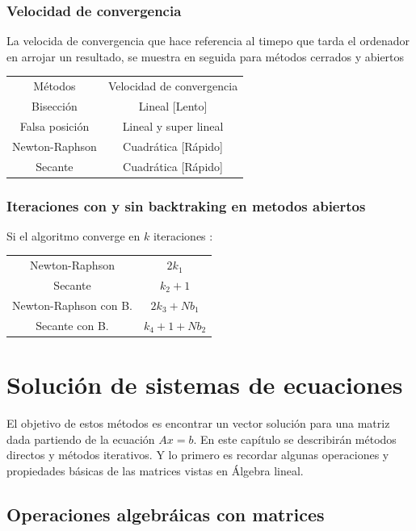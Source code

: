 \subsection*{Velocidad de convergencia}
La velocida de convergencia que hace referencia al timepo que tarda el ordenador en arrojar un resultado, se muestra en seguida para m\'etodos cerrados y abiertos 
\\
\begin{center}
\begin{tabular}{	c		c	}
M\'etodos & Velocidad de convergencia \\
Bisecci\'on & Lineal [Lento] \\
Falsa posici\'on & Lineal y super lineal \\
Newton-Raphson & Cuadr\'atica [R\'apido] \\
Secante & Cuadr\'atica [R\'apido] \\
\end{tabular}
\end{center}

\subsection*{Iteraciones con y sin backtraking en metodos abiertos}
Si el algoritmo converge en $k$ iteraciones :
\begin{center}
\begin{tabular}{	c		c	}
Newton-Raphson & $2k_1$ \\
Secante & $k_2+1$ \\
Newton-Raphson con B. & $2k_3+Nb_1$ \\
Secante con B. & $k_4+1+Nb_2$
\end{tabular}
\end{center}

\chapter{Soluci\'on de sistemas de ecuaciones}
El objetivo de estos m\'etodos es encontrar un vector soluci\'on para una matriz dada partiendo de la ecuaci\'on $Ax=b$. En este cap\'itulo se describir\'an m\'etodos directos y m\'etodos iterativos. Y lo primero es recordar algunas operaciones y propiedades b\'asicas de las matrices vistas en \'Algebra lineal. 

\section{Operaciones algebr\'aicas con matrices}
